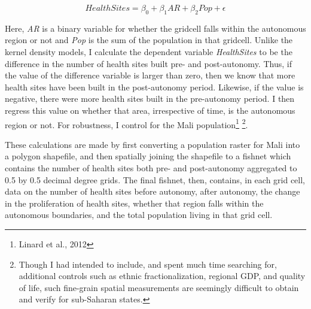 \documentclass[12pt]{article}
\begin{document}
\begin{equation}
\label{eq:emc}
Health Sites = \beta_0 + \beta_1 AR + \beta_2 Pop + \epsilon
\end{equation}

Here, \textit{AR} is a binary variable for whether the gridcell falls within the autonomous region or not and \textit{Pop} is the sum of the population in that gridcell. Unlike the kernel density models, I calculate the dependent variable \textit{HealthSites} to be the difference in the number of health sites built pre- and post-autonomy. Thus, if the value of the difference variable is larger than zero, then we know that more health sites have been built in the post-autonomy period. Likewise, if the value is negative, there were more health sites built in the pre-autonomy period. I then regress this value on whether that area, irrespective of time, is the autonomous region or not. For robustness, I control for the Mali population\footnote{Linard et al., 2012} \footnote{Though I had intended to include, and spent much time searching for, additional controls such as ethnic fractionalization, regional GDP, and quality of life, such fine-grain spatial measurements are seemingly difficult to obtain and verify for sub-Saharan states.}. 

These calculations are made by first converting a population raster for Mali into a polygon shapefile, and then spatially joining the shapefile to a fishnet which contains the number of health sites both pre- and post-autonomy aggregated to 0.5 by 0.5 decimal degree grids. The final fishnet, then, contains, in each grid cell, data on the number of health sites before autonomy, after autonomy, the change in the proliferation of health sites, whether that region falls within the autonomous boundaries, and the total population living in that grid cell. 

\begin{table}
    \small
\begin{center}
\end{center}
\caption{OLS Results}
\end{table}
\end{document}
